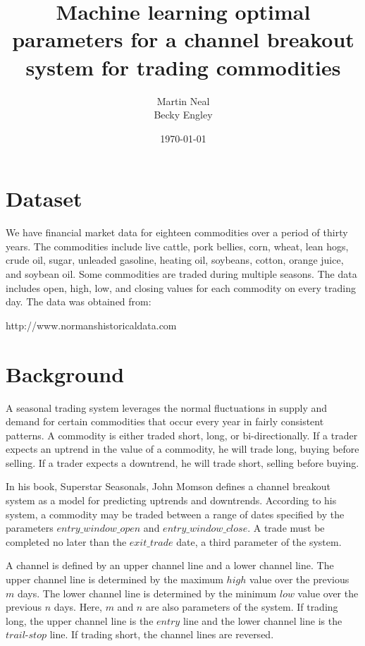 \documentclass[10pt]{article}
\title{Machine learning optimal parameters for a channel breakout system for trading
commodities}
\author{Martin Neal\\
  Becky Engley}
\date{\today}
\begin{document}
\maketitle

\section{Dataset}

We have financial market data for eighteen commodities over a period of thirty
years.  The commodities include live cattle, pork bellies, corn, wheat, lean
hogs, crude oil, sugar, unleaded gasoline, heating oil, soybeans, cotton, orange
juice, and soybean oil.  Some commodities are traded during multiple seasons.
The data includes open, high, low, and closing values for each commodity on
every trading day. The data was obtained
from:

http://www.normanshistoricaldata.com

\section{Background}

A seasonal trading system leverages the normal fluctuations in supply and demand for
certain commodities that occur every year in fairly consistent patterns.  A
commodity is either traded short, long, or bi-directionally.  If a trader expects
an uptrend in the value of a commodity, he will trade long, buying before
selling.  If a trader expects a downtrend, he will trade short, selling before
buying.

In his book, Superstar Seasonals, John Momson defines a channel breakout system
as a model for predicting uptrends and downtrends.  According to his system, a
commodity may be traded between a range of dates specified by the parameters
$entry\_window\_open$ and $entry\_window\_close$.  A trade must be completed no
later than the $exit\_trade$ date, a third parameter of the system.

A channel is defined by an upper channel line and a lower channel line.  The
upper channel line is determined by the maximum $high$ value over the previous
$m$ days.  The lower channel line is determined by the minimum $low$ value
over the previous $n$ days.  Here, $m$ and $n$ are also parameters of the
system.  If trading long, the upper channel line is the $entry$ line and the lower
channel line is the $trail$-$stop$ line.  If trading short, the channel lines are
reversed.
\end{document}
